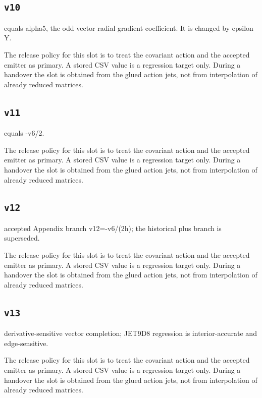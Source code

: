 \documentclass[11pt,a4paper,oneside]{book}
\begin{document}
\subsection{\texttt{v10}}
equals alpha5, the odd vector radial-gradient coefficient. It is changed by epsilon Y.

The release policy for this slot is to treat the covariant action and the accepted emitter as primary. A stored CSV value is a regression target only. During a handover the slot is obtained from the glued action jets, not from interpolation of already reduced matrices.\par

\subsection{\texttt{v11}}
equals -v6/2.

The release policy for this slot is to treat the covariant action and the accepted emitter as primary. A stored CSV value is a regression target only. During a handover the slot is obtained from the glued action jets, not from interpolation of already reduced matrices.\par

\subsection{\texttt{v12}}
accepted Appendix branch v12=-v6/(2h); the historical plus branch is superseded.

The release policy for this slot is to treat the covariant action and the accepted emitter as primary. A stored CSV value is a regression target only. During a handover the slot is obtained from the glued action jets, not from interpolation of already reduced matrices.\par

\subsection{\texttt{v13}}
derivative-sensitive vector completion; JET9D8 regression is interior-accurate and edge-sensitive.

The release policy for this slot is to treat the covariant action and the accepted emitter as primary. A stored CSV value is a regression target only. During a handover the slot is obtained from the glued action jets, not from interpolation of already reduced matrices.\par
\end{document}
